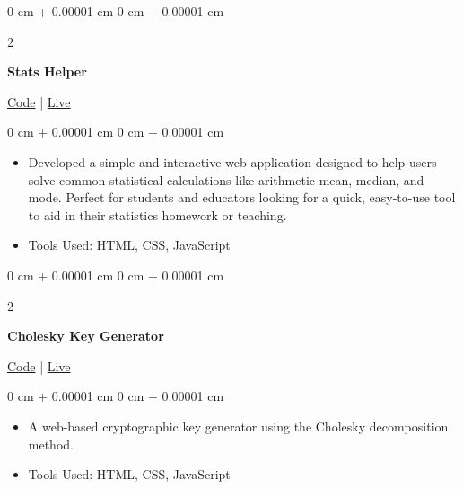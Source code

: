 \documentclass[10pt, letterpaper]{article}
\newenvironment{highlights}{
    \begin{itemize}[
        topsep=0.10 cm,
        parsep=0.10 cm,
        partopsep=0pt,
        itemsep=0pt,
        leftmargin=0 cm + 10pt
    ]
}{
    \end{itemize}
} %
\newenvironment{onecolentry}{
    \begin{adjustwidth}{
        0 cm + 0.00001 cm
    }{
        0 cm + 0.00001 cm
    }
}{
    \end{adjustwidth}
} %
\newenvironment{twocolentry}[2][]{
    \onecolentry
    \def\secondColumn{#2}
    \setcolumnwidth{\fill, 4.5 cm}
    \begin{paracol}{2}
}{
    \switchcolumn \raggedleft \secondColumn
    \end{paracol}
    \endonecolentry
} %
\begin{document}
        \vspace{0.2 cm}

        \begin{twocolentry}
            {
                \href{https://github.com/itstheavro/stats-helper/}{Code}
                |
                \href{https://itstheavro.github.io/stats-helper/}{Live}
            }
            \textbf{Stats Helper}
        \end{twocolentry}

        \vspace{0.10 cm}
        
        \begin{onecolentry}
            \begin{highlights}
                \item Developed a simple and interactive web application designed to help users solve common statistical calculations like arithmetic mean, median, and mode. Perfect for students and educators looking for a quick, easy-to-use tool to aid in their statistics homework or teaching.
                \item Tools Used: HTML, CSS, JavaScript
            \end{highlights}
        \end{onecolentry}
        
        \vspace{0.2 cm}

        \begin{twocolentry}
            {
                \href{https://github.com/ItsTHEAvro/Cholesky-Key-Generator}{Code}
                |
                \href{https://itstheavro.github.io/Cholesky-Key-Generator/}{Live}
            }
            \textbf{Cholesky Key Generator}
        \end{twocolentry}

        \vspace{0.10 cm}
        
        \begin{onecolentry}
            \begin{highlights}
                \item A web-based cryptographic key generator using the Cholesky decomposition method.
                \item Tools Used: HTML, CSS, JavaScript
            \end{highlights}
        \end{onecolentry}
        
        \vspace{0.2 cm}
\end{document}
